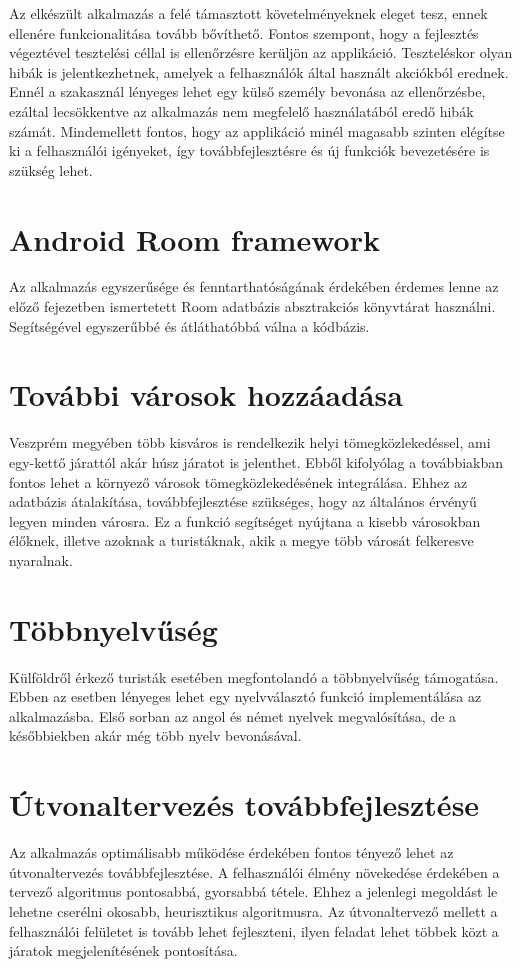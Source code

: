 
Az elkészült alkalmazás a felé támasztott követelményeknek eleget tesz, ennek ellenére funkcionalitása tovább bővíthető.
Fontos szempont, hogy a fejlesztés végeztével tesztelési céllal is ellenőrzésre kerüljön az applikáció.
Teszteléskor olyan hibák is jelentkezhetnek, amelyek a felhasználók által használt akciókból erednek.
Ennél a szakasznál lényeges lehet egy külső személy bevonása az ellenőrzésbe, ezáltal lecsökkentve az alkalmazás nem megfelelő használatából eredő hibák számát.
Mindemellett fontos, hogy az applikáció minél magasabb szinten elégítse ki a felhasználói igényeket, így továbbfejlesztésre és új funkciók bevezetésére is szükség lehet.

\section*{Android Room framework}
\label{androidroom}
Az alkalmazás egyszerűsége és fenntarthatóságának érdekében érdemes lenne az előző fejezetben ismertetett Room adatbázis absztrakciós könyvtárat használni.
Segítségével egyszerűbbé és átláthatóbbá válna a kódbázis.

\section*{További városok hozzáadása}
\label{morecity}
Veszprém megyében több kisváros is rendelkezik helyi tömegközlekedéssel, ami egy-kettő járattól akár húsz járatot is jelenthet.
Ebből kifolyólag a továbbiakban fontos lehet a környező városok tömegközlekedésének integrálása.
Ehhez az adatbázis átalakítása, továbbfejlesztése szükséges, hogy az általános érvényű legyen minden városra.
Ez a funkció segítséget nyújtana a kisebb városokban élőknek, illetve azoknak a turistáknak, akik a megye több városát felkeresve nyaralnak.

\section*{Többnyelvűség}
\label{internationalization}
Külföldről érkező turisták esetében megfontolandó a többnyelvűség támogatása.
Ebben az esetben lényeges lehet egy nyelvválasztó funkció implementálása az alkalmazásba.
Első sorban az angol és német nyelvek megvalósítása, de a későbbiekben akár még több nyelv bevonásával.

\section*{Útvonaltervezés továbbfejlesztése}
\label{routeplan}
Az alkalmazás optimálisabb működése érdekében fontos tényező lehet az útvonaltervezés továbbfejlesztése.
A felhasználói élmény növekedése érdekében a tervező algoritmus pontosabbá, gyorsabbá tétele.
Ehhez a jelenlegi megoldást le lehetne cserélni okosabb, heurisztikus algoritmusra.
Az útvonaltervező mellett a felhasználói felületet is tovább lehet fejleszteni, ilyen feladat lehet többek közt a járatok megjelenítésének pontosítása. 

